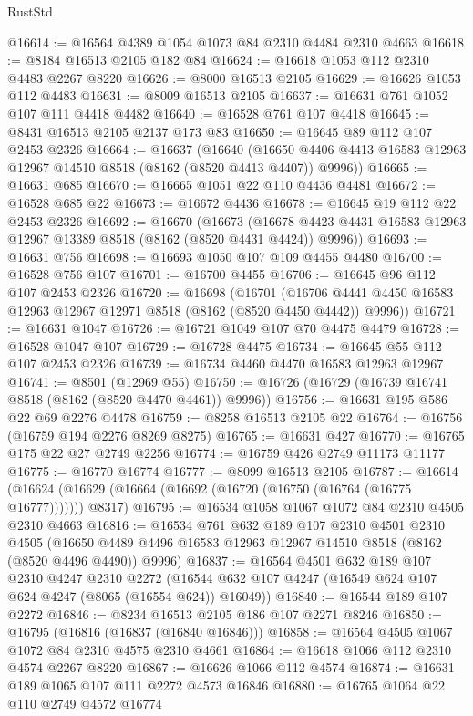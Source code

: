 \begin{lexlean}{RustStd}
\begin{coremodule}
@16614 := @16564 @4389 @1054 @1073 @84 @2310 @4484 @2310 @4663
@16618 := @8184 @16513 @2105 @182 @84
@16624 := @16618 @1053 @112 @2310 @4483 @2267 @8220
@16626 := @8000 @16513 @2105
@16629 := @16626 @1053 @112 @4483
@16631 := @8009 @16513 @2105
@16637 := @16631 @761 @1052 @107 @111 @4418 @4482
@16640 := @16528 @761 @107 @4418
@16645 := @8431 @16513 @2105 @2137 @173 @83
@16650 := @16645 @89 @112 @107 @2453 @2326
@16664 := @16637
    (@16640
      (@16650 @4406 @4413 @16583 @12963 @12967 @14510 @8518 (@8162 (@8520 @4413 @4407)) @9996))
@16665 := @16631 @685
@16670 := @16665 @1051 @22 @110 @4436 @4481
@16672 := @16528 @685 @22
@16673 := @16672 @4436
@16678 := @16645 @19 @112 @22 @2453 @2326
@16692 := @16670
    (@16673
      (@16678 @4423 @4431 @16583 @12963 @12967 @13389 @8518 (@8162 (@8520 @4431 @4424)) @9996))
@16693 := @16631 @756
@16698 := @16693 @1050 @107 @109 @4455 @4480
@16700 := @16528 @756 @107
@16701 := @16700 @4455
@16706 := @16645 @96 @112 @107 @2453 @2326
@16720 := @16698
    (@16701
      (@16706 @4441 @4450 @16583 @12963 @12967 @12971 @8518 (@8162 (@8520 @4450 @4442)) @9996))
@16721 := @16631 @1047
@16726 := @16721 @1049 @107 @70 @4475 @4479
@16728 := @16528 @1047 @107
@16729 := @16728 @4475
@16734 := @16645 @55 @112 @107 @2453 @2326
@16739 := @16734 @4460 @4470 @16583 @12963 @12967
@16741 := @8501 (@12969 @55)
@16750 := @16726 (@16729 (@16739 @16741 @8518 (@8162 (@8520 @4470 @4461)) @9996))
@16756 := @16631 @195 @586 @22 @69 @2276 @4478
@16759 := @8258 @16513 @2105 @22
@16764 := @16756 (@16759 @194 @2276 @8269 @8275)
@16765 := @16631 @427
@16770 := @16765 @175 @22 @27 @2749 @2256
@16774 := @16759 @426 @2749 @11173 @11177
@16775 := @16770 @16774
@16777 := @8099 @16513 @2105
@16787 := @16614
    (@16624 (@16629 (@16664 (@16692 (@16720 (@16750 (@16764 (@16775 @16777))))))) @8317)
@16795 := @16534 @1058 @1067 @1072 @84 @2310 @4505 @2310 @4663
@16816 := @16534
    @761
    @632
    @189
    @107
    @2310
    @4501
    @2310
    @4505
    (@16650 @4489 @4496 @16583 @12963 @12967 @14510 @8518 (@8162 (@8520 @4496 @4490)) @9996)
@16837 := @16564
    @4501
    @632
    @189
    @107
    @2310
    @4247
    @2310
    @2272
    (@16544 @632 @107 @4247 (@16549 @624 @107 @624 @4247 (@8065 (@16554 @624)) @16049))
@16840 := @16544 @189 @107 @2272
@16846 := @8234 @16513 @2105 @186 @107 @2271 @8246
@16850 := @16795 (@16816 (@16837 (@16840 @16846)))
@16858 := @16564 @4505 @1067 @1072 @84 @2310 @4575 @2310 @4661
@16864 := @16618 @1066 @112 @2310 @4574 @2267 @8220
@16867 := @16626 @1066 @112 @4574
@16874 := @16631 @189 @1065 @107 @111 @2272 @4573 @16846
@16880 := @16765 @1064 @22 @110 @2749 @4572 @16774

\end{coremodule}
\end{lexlean}
